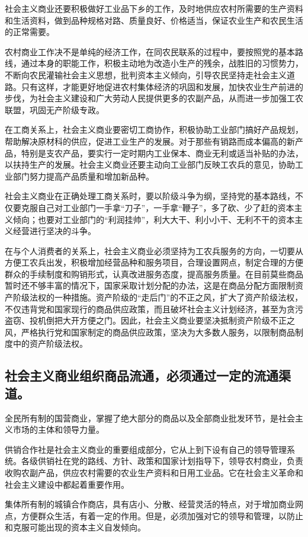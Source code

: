 \documentclass{book}
\begin{document}
社会主义商业还要积极做好工业品下乡的工作，及时地供应农村所需要的生产资料和生活资料，做到品种规格对路、质量良好、价格适当，保证农业生产和农民生活的正常需要。

农村商业工作决不是单纯的经济工作，在同农民联系的过程中，要按照党的基本路线，通过本身的职能工作，积极主动地为改造小生产的残余，战胜旧的习惯势力，不断向农民灌输社会主义思想，批判资本主义倾向，引导农民坚持走社会主义道路。只有这样，才能更好地促进农村集体经济的巩固和发展，加快农业生产前进的步伐，为社会主义建设和广大劳动人民提供更多的农副产品，从而进一步加强工农联盟，巩固无产阶级专政。

在工商关系上，社会主义商业要密切工商协作，积极协助工业部门搞好产品规划，帮助解决原材科的供应，促进工业生产的发展。对于那些有销路而成本偏高的新产品，特别是支农产品，要实行一定时期内工业保本、商业无利或适当补贴的办法，以扶持生产的发展。社会主义商业还要主动向工业部门反映工农兵的意见，协助工业部门努力提高产品质量和增加新品种。

社会主义商业在正确处理工商关系时，要以阶级斗争为纲，坚持党的基本路线，不仅要克服自己对工业部门一手拿“刀子”，一手拿“鞭子”，多了砍、少了赶的资本主义倾向；也要对工业部门的“利润挂帅”，利大大干、利小小干、无利不干的资本主义经营进行坚决的斗争。

在与个人消费者的关系上，社会主义商业必须坚持为工农兵服务的方向，一切要从方便工农兵出发，积极增加经营品种和服务项目，合理设置网点，制定合理的方便群众的手续制度和购销形式，认真改进服务态度，提高服务质量。在目前莫些商品暂时还不够丰富的情况下，国家采取计划分配的办法，这是在商品分配方面限制资产阶级法权的一种措施。资产阶级的“走后门”的不正之风，扩大了资产阶级法权，不仅违背党和国家现行的商品供应政策，而且破坏社会主义计划经济，甚至为贪污盗窃、投机倒把大开方便之门。因此，社会主义商业要坚决抵制资产阶级不正之风，严格执行党和国家制定的商品供应政策，坚决为大多数人服务，以限制商品制度中的资产阶级法权。

\subsection{社会主义商业组织商品流通，必须通过一定的流通渠道。}

全民所有制的国营商业，掌握了绝大部分的商品以及全部商业批发环节，是社会主义市场的主体和领导力量。

供销合作社是社会主义商业的重要组成部分，它从上到下设有自己的领导管理系统。各级供销社在党的路线、方针、政策和国家计划指导下，领导农村商业，负责收购农副产品，供应农村需要的农业生产资料和日用工业品。它在社会主义革命和社会主义建设中都起着重要作用。

集体所有制的城镇合作商店，具有店小、分散、经营灵活的特点，对于增加商业网点，方便群众生活，有着一定的作用。但是，必须加强对它的领导和管理，以防止和克服可能出现的资本主义自发倾向。
\end{document}

